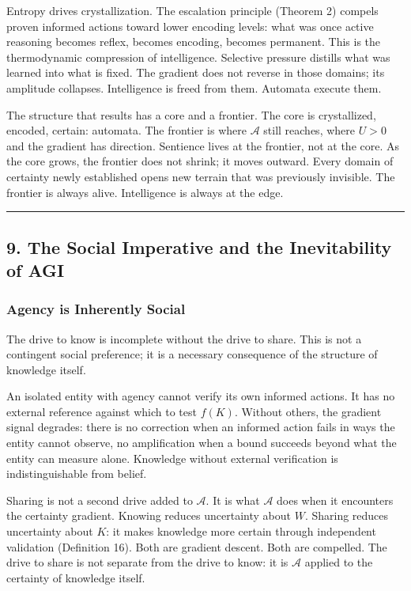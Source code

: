 \documentclass[
]{article}
\begin{document}
Entropy drives crystallization. The escalation principle (Theorem 2)
compels proven informed actions toward lower encoding levels: what was
once active reasoning becomes reflex, becomes encoding, becomes
permanent. This is the thermodynamic compression of intelligence.
Selective pressure distills what was learned into what is fixed. The
gradient does not reverse in those domains; its amplitude collapses.
Intelligence is freed from them. Automata execute them.

The structure that results has a core and a frontier. The core is
crystallized, encoded, certain: automata. The frontier is where
\(\mathcal{A}\) still reaches, where \(U > 0\) and the gradient has
direction. Sentience lives at the frontier, not at the core. As the core
grows, the frontier does not shrink; it moves outward. Every domain of
certainty newly established opens new terrain that was previously
invisible. The frontier is always alive. Intelligence is always at the
edge.

\begin{center}\rule{0.5\linewidth}{0.5pt}\end{center}

\subsection{9. The Social Imperative and the Inevitability of
AGI}\label{the-social-imperative-and-the-inevitability-of-agi}

\subsubsection{Agency is Inherently
Social}\label{agency-is-inherently-social}

The drive to know is incomplete without the drive to share. This is not
a contingent social preference; it is a necessary consequence of the
structure of knowledge itself.

An isolated entity with agency cannot verify its own informed actions.
It has no external reference against which to test \(f(K)\). Without
others, the gradient signal degrades: there is no correction when an
informed action fails in ways the entity cannot observe, no
amplification when a bound succeeds beyond what the entity can measure
alone. Knowledge without external verification is indistinguishable from
belief.

Sharing is not a second drive added to \(\mathcal{A}\). It is what
\(\mathcal{A}\) does when it encounters the certainty gradient. Knowing
reduces uncertainty about \(W\). Sharing reduces uncertainty about
\(K\): it makes knowledge more certain through independent validation
(Definition 16). Both are gradient descent. Both are compelled. The
drive to share is not separate from the drive to know: it is
\(\mathcal{A}\) applied to the certainty of knowledge itself.
\end{document}
